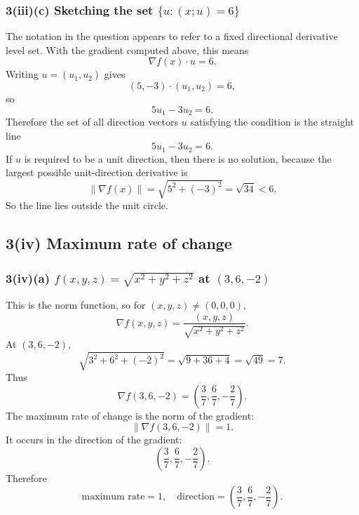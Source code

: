 \documentclass[11pt]{article}
\newcommand{\norm}[1]{\left\lVert #1\right\rVert}
\newcommand{\grad}{\nabla}
\begin{document}
\subsubsection*{3(iii)(c) Sketching the set $\{u:(x;u)=6\}$}
The notation in the question appears to refer to a fixed directional derivative level set.  With the gradient computed above, this means
\[
 \grad f(x)\cdot u=6.
\]
Writing $u=(u_1,u_2)$ gives
\[
 (5,-3)\cdot(u_1,u_2)=6,
\]
so
\[
 5u_1-3u_2=6.
\]
Therefore the set of all direction vectors $u$ satisfying the condition is the straight line
\[
 \boxed{5u_1-3u_2=6.}
\]
If $u$ is required to be a unit direction, then there is no solution, because the largest possible unit-direction derivative is
\[
 \norm{\grad f(x)}=\sqrt{5^2+(-3)^2}=\sqrt{34}<6.
\]
So the line lies outside the unit circle.

\begin{center}
\end{center}

\subsection*{3(iv) Maximum rate of change}

\subsubsection*{3(iv)(a) $f(x,y,z)=\sqrt{x^2+y^2+z^2}$ at $(3,6,-2)$}
This is the norm function, so for $(x,y,z)\neq(0,0,0)$,
\[
 \grad f(x,y,z)=\frac{(x,y,z)}{\sqrt{x^2+y^2+z^2}}.
\]
At $(3,6,-2)$,
\[
 \sqrt{3^2+6^2+(-2)^2}=\sqrt{9+36+4}=\sqrt{49}=7.
\]
Thus
\[
 \grad f(3,6,-2)=\left(\frac37,\frac67,-\frac27\right).
\]
The maximum rate of change is the norm of the gradient:
\[
 \norm{\grad f(3,6,-2)}=1.
\]
It occurs in the direction of the gradient:
\[
 \left(\frac37,\frac67,-\frac27\right).
\]
Therefore
\[
 \boxed{\text{maximum rate}=1,\quad \text{direction}=\left(\frac37,\frac67,-\frac27\right).}
\]
\end{document}
